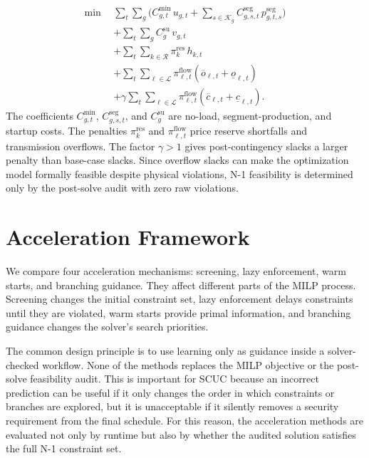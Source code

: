 \documentclass[runningheads]{llncs}
\begin{document}
\begin{align}
\min \ \ & \sum_{t}\sum_{g}\Big( C^{\min}_{g,t}\,u_{g,t} + \sum_{s\in\mathcal{K}_g} C^{\mathrm{seg}}_{g,s,t}\, p^{\mathrm{seg}}_{g,t,s} \Big) \nonumber\\
& + \sum_{t}\sum_{g} C^{\mathrm{su}}_g\, v_{g,t} \label{eq:obj}\\
& + \sum_{t}\sum_{k\in\mathcal{R}} \pi^{\mathrm{res}}_k\, h_{k,t} \nonumber\\
& + \sum_{t}\sum_{\ell\in\mathcal{L}} \pi^{\mathrm{flow}}_{\ell,t}(\overline{o}_{\ell,t}+\underline{o}_{\ell,t}) \nonumber\\
& + \gamma \sum_{t}\sum_{\ell\in\mathcal{L}} \pi^{\mathrm{flow}}_{\ell,t}(\overline{c}_{\ell,t}+\underline{c}_{\ell,t}). \nonumber
\end{align}
The coefficients $C^{\min}_{g,t}$, $C^{\mathrm{seg}}_{g,s,t}$, and $C^{\mathrm{su}}_g$ are no-load, segment-production, and startup costs. The penalties $\pi^{\mathrm{res}}_k$ and $\pi^{\mathrm{flow}}_{\ell,t}$ price reserve shortfalls and transmission overflows. The factor $\gamma>1$ gives post-contingency slacks a larger penalty than base-case slacks. Since overflow slacks can make the optimization model formally feasible despite physical violations, N-1 feasibility is determined only by the post-solve audit with zero raw violations.

\section{Acceleration Framework}
We compare four acceleration mechanisms: screening, lazy enforcement, warm starts, and branching guidance. They affect different parts of the MILP process. Screening changes the initial constraint set, lazy enforcement delays constraints until they are violated, warm starts provide primal information, and branching guidance changes the solver's search priorities.

The common design principle is to use learning only as guidance inside a solver-checked workflow. None of the methods replaces the MILP objective or the post-solve feasibility audit. This is important for SCUC because an incorrect prediction can be useful if it only changes the order in which constraints or branches are explored, but it is unacceptable if it silently removes a security requirement from the final schedule. For this reason, the acceleration methods are evaluated not only by runtime but also by whether the audited solution satisfies the full N-1 constraint set.
\end{document}
